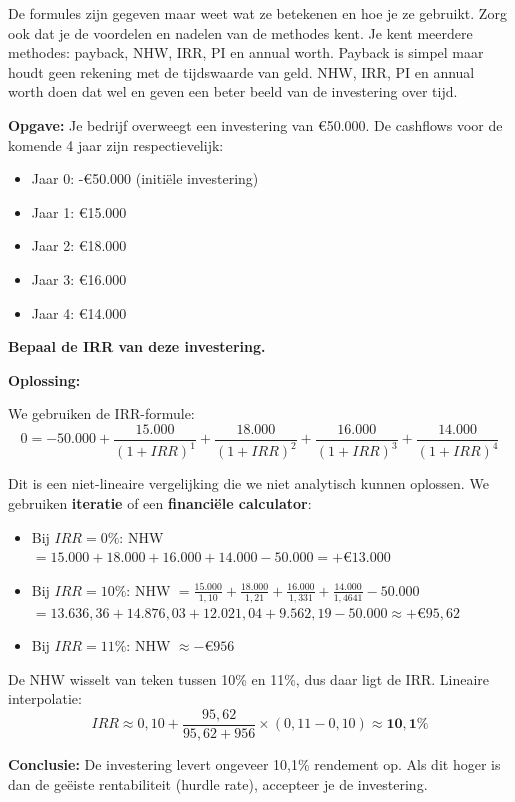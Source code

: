 \documentclass[a4paper,11pt]{article}
\begin{document}
\begin{examenbox}
    De formules zijn gegeven maar weet wat ze betekenen en hoe je ze gebruikt.
    Zorg ook dat je de voordelen en nadelen van de methodes kent.
    Je kent meerdere methodes: payback, NHW, IRR, PI en annual worth.
    Payback is simpel maar houdt geen rekening met de tijdswaarde van geld.
    NHW, IRR, PI en annual worth doen dat wel en geven een beter beeld van de investering over tijd.
\end{examenbox}

\begin{oefenblok}
    \textbf{Opgave:} Je bedrijf overweegt een investering van €50.000.
    De cashflows voor de komende 4 jaar zijn respectievelijk:
    \begin{itemize}
        \item Jaar 0: -€50.000 (initiële investering)
        \item Jaar 1: €15.000
        \item Jaar 2: €18.000
        \item Jaar 3: €16.000
        \item Jaar 4: €14.000
    \end{itemize}

    \textbf{Bepaal de IRR van deze investering.}

    \vspace{5mm}

    \textbf{Oplossing:}

    We gebruiken de IRR-formule:
    $$0 = -50.000 + \frac{15.000}{(1+IRR)^1} + \frac{18.000}{(1+IRR)^2} + \frac{16.000}{(1+IRR)^3} + \frac{14.000}{(1+IRR)^4}$$

    Dit is een niet-lineaire vergelijking die we niet analytisch kunnen oplossen.
    We gebruiken \textbf{iteratie} of een \textbf{financiële calculator}:

    \begin{itemize}
        \item Bij $IRR = 0\%$: NHW $= 15.000 + 18.000 + 16.000 + 14.000 - 50.000 = +€13.000$
        \item Bij $IRR = 10\%$: NHW $= \frac{15.000}{1,10} + \frac{18.000}{1,21} + \frac{16.000}{1,331} + \frac{14.000}{1,4641} - 50.000$ \\
              $= 13.636,36 + 14.876,03 + 12.021,04 + 9.562,19 - 50.000 \approx +€95,62$
        \item Bij $IRR = 11\%$: NHW $\approx -€956$
    \end{itemize}

    De NHW wisselt van teken tussen 10\% en 11\%, dus daar ligt de IRR. Lineaire interpolatie:
    \[
        IRR \approx 0{,}10 + \frac{95{,}62}{95{,}62 + 956} \times (0{,}11 - 0{,}10) \approx \mathbf{10{,}1\%}
    \]

    \textbf{Conclusie:} De investering levert ongeveer 10,1\% rendement op.
    Als dit hoger is dan de geëiste rentabiliteit (hurdle rate), accepteer je de investering.
\end{oefenblok}
\end{document}
